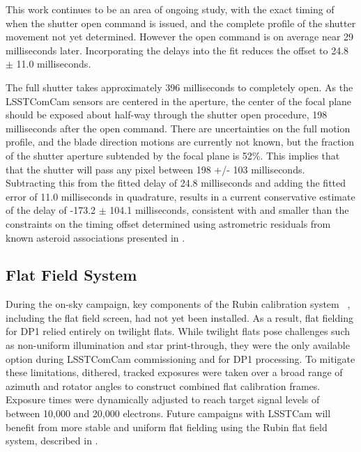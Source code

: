 This work continues to be an area of ongoing study, with the exact timing of when the shutter open command is issued, and the complete profile of the shutter movement not yet determined.
However the open command is on average near 29 milliseconds later. Incorporating the delays into the fit reduces the offset to 24.8 $\pm$ 11.0 milliseconds.

The full shutter takes approximately 396 milliseconds to completely open.
As the \gls{LSSTComCam} sensors are centered in the aperture, the center of the focal plane should be exposed about half-way through the shutter open procedure, 198 milliseconds after the open command.
There are uncertainties on the full motion profile, and the blade direction motions are currently not known, but the fraction of the shutter aperture subtended by the focal plane is 52\%.
This implies that that the shutter will pass any pixel between 198 +/- 103 milliseconds.
Subtracting this from the fitted delay of 24.8 milliseconds and adding the fitted error of 11.0 milliseconds in quadrature, results in a current conservative estimate of the delay of -173.2 $\pm$ 104.1 milliseconds, consistent with and smaller than the constraints on the timing offset determined using astrometric residuals from known asteroid associations presented in .

\subsection{Flat Field System}
\label{ssec:flat_field_system}
During the on-sky campaign, key components of the Rubin calibration system ~\citep{2022SPIE12182E..0RI}, including the flat field screen, had not yet been installed.
As a result, flat fielding for \gls{DP1} relied entirely on twilight flats.
While twilight flats pose challenges such as non-uniform illumination and star print-through, they were the only available option during \gls{LSSTComCam} commissioning and for \gls{DP1} processing.
To mitigate these limitations, dithered, tracked exposures were taken over a broad range of azimuth and rotator angles to construct combined flat \gls{calibration} frames.
Exposure times were dynamically adjusted to reach target signal levels of between 10,000 and 20,000 electrons.
Future campaigns with \gls{LSSTCam} will benefit from more stable and uniform flat fielding using the Rubin flat field system, described in \citet{SITCOMTN-086}.
%
